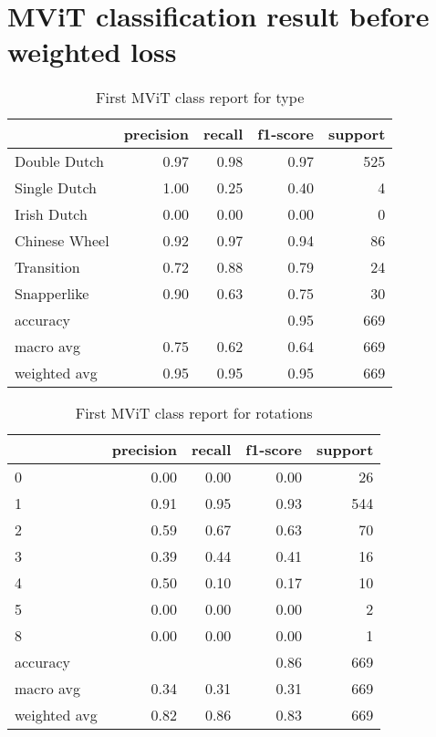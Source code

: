 
\section{MViT classification result before weighted loss}

\begin{table}[h!]
    \begin{tabular}{|l|r|r|r|r|}
        \hline          & precision & recall & f1-score & support \\
        \hline
        Double Dutch    &   0.97    &   0.98    &   0.97    &  525 \\
        Single Dutch    &   1.00    &   0.25    &   0.40    &  4   \\
        Irish Dutch     &   0.00    &   0.00    &   0.00    &  0   \\
        Chinese Wheel   &   0.92    &   0.97    &   0.94    &  86  \\
        Transition      &   0.72    &   0.88    &   0.79    &  24  \\
        Snapperlike     &   0.90    &   0.63    &   0.75    &  30  \\
        \hline
        accuracy        &           &           &   0.95    &  669 \\
        macro avg       &   0.75    &   0.62    &   0.64    &  669 \\
        weighted avg    &   0.95    &   0.95    &   0.95    &  669 \\ \hline
    \end{tabular}
    \caption[Type distribution]{First MViT class report for type}
    \label{tbl:mvit-first-class-reports-type}
\end{table}

\begin{table}[h!]
    \begin{tabular}{|l|r|r|r|r|}
        \hline
          &  precision &   recall & f1-score &  support \\ \hline
        0 &       0.00 &     0.00 &     0.00 &       26 \\
        1 &       0.91 &     0.95 &     0.93 &      544 \\
        2 &       0.59 &     0.67 &     0.63 &       70 \\
        3 &       0.39 &     0.44 &     0.41 &       16 \\
        4 &       0.50 &     0.10 &     0.17 &       10 \\
        5 &       0.00 &     0.00 &     0.00 &        2 \\
        8 &       0.00 &     0.00 &     0.00 &        1 \\
        \hline
        accuracy &            &          &     0.86 &      669 \\
        macro avg &       0.34 &     0.31 &     0.31 &      669 \\
        weighted avg &       0.82 &     0.86 &     0.83 &      669 \\ \hline
    \end{tabular}
    \caption[Rotation distribution]{First MViT class report for rotations}
    \label{tbl:mvit-first-class-reports-rotations}
\end{table}

